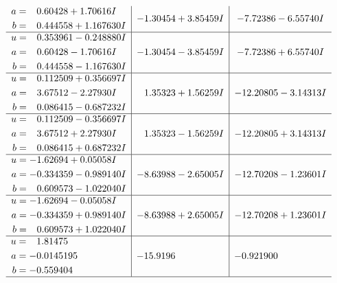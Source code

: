 \documentclass[1p]{elsarticle_modified}
\theoremstyle{definition}
\begin{document}
$$\begin{array}{c|c|c}
\begin{aligned}
a &= \phantom{-}0.60428 + 1.70616 I \\
b &= \phantom{-}0.444558 + 1.167630 I\end{aligned}
 & -1.30454 + 3.85459 I & -7.72386 - 6.55740 I \\ \hline\begin{aligned}
u &= \phantom{-}0.353961 - 0.248880 I \\
a &= \phantom{-}0.60428 - 1.70616 I \\
b &= \phantom{-}0.444558 - 1.167630 I\end{aligned}
 & -1.30454 - 3.85459 I & -7.72386 + 6.55740 I \\ \hline\begin{aligned}
u &= \phantom{-}0.112509 + 0.356697 I \\
a &= \phantom{-}3.67512 - 2.27930 I \\
b &= \phantom{-}0.086415 - 0.687232 I\end{aligned}
 & \phantom{-}1.35323 + 1.56259 I & -12.20805 - 3.14313 I \\ \hline\begin{aligned}
u &= \phantom{-}0.112509 - 0.356697 I \\
a &= \phantom{-}3.67512 + 2.27930 I \\
b &= \phantom{-}0.086415 + 0.687232 I\end{aligned}
 & \phantom{-}1.35323 - 1.56259 I & -12.20805 + 3.14313 I \\ \hline\begin{aligned}
u &= -1.62694 + 0.05058 I \\
a &= -0.334359 - 0.989140 I \\
b &= \phantom{-}0.609573 - 1.022040 I\end{aligned}
 & -8.63988 - 2.65005 I & -12.70208 - 1.23601 I \\ \hline\begin{aligned}
u &= -1.62694 - 0.05058 I \\
a &= -0.334359 + 0.989140 I \\
b &= \phantom{-}0.609573 + 1.022040 I\end{aligned}
 & -8.63988 + 2.65005 I & -12.70208 + 1.23601 I \\ \hline\begin{aligned}
u &= \phantom{-}1.81475\phantom{ +0.000000I} \\
a &= -0.0145195\phantom{ +0.000000I} \\
b &= -0.559404\phantom{ +0.000000I}\end{aligned}
 & -15.9196\phantom{ +0.000000I} & -0.921900\phantom{ +0.000000I}\\
 \hline 
 \end{array}$$\newpage
\end{document}
